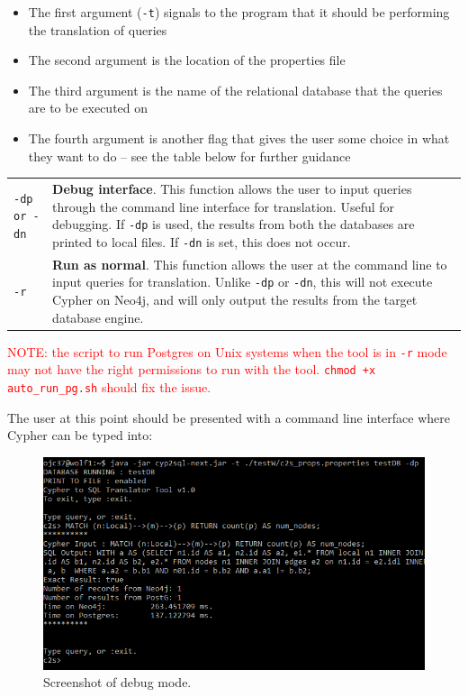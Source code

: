 \documentclass[letterpaper]{ltxdoc}
\begin{document}
\medskip

\begin{itemize}
\item The first argument (\texttt{-t}) signals to the program that it should be performing the translation of queries
\item The second argument is the location of the properties file
\item The third argument is the name of the relational database that the queries are to be executed on
\item The fourth argument is another flag that gives the user some choice in what they want to do -- see the table below for further guidance
\end{itemize}

\begin{center}
\begin{tabular}{ p{2cm} p{11.5cm} }
\texttt{-dp or -dn} & \textbf{Debug interface}. This function allows the user to input queries through the command line interface for translation. Useful for debugging. If \texttt{-dp} is used, the results from both the databases are printed to local files. If \texttt{-dn} is set, this does not occur. \\

\texttt{-r} & \textbf{Run as normal}. This function allows the user at the command line to input queries for translation. Unlike \texttt{-dp} or \texttt{-dn}, this will not execute Cypher on Neo4j, and will only output the results from the target database engine.
\end{tabular}
\end{center}

\medskip

\textcolor{red}{NOTE: the script to run Postgres on Unix systems when the tool is in \texttt{-r} mode may not have the right permissions to run with the tool. \texttt{chmod +x auto\_run\_pg.sh} should fix the issue.}

\medskip

The user at this point should be presented with a command line interface where Cypher can be typed into:

\begin{figure}[h]
\centerline{\includegraphics[width=\textwidth,height=\textheight,keepaspectratio]{ss1.png}}
\caption{Screenshot of debug mode.}
\label{ss1}
\end{figure}
\end{document}
